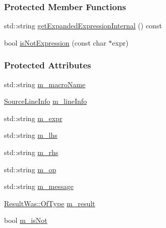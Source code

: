\subsubsection*{Protected Member Functions}
\begin{DoxyCompactItemize}
\item 
std\-::string \hyperlink{classCatch_1_1ResultInfo_a7a7f94f42a2b929b48cd1619028e1101}{get\-Expanded\-Expression\-Internal} () const 
\item 
bool \hyperlink{classCatch_1_1ResultInfo_a132ee623d29aadf0a8f031b766540629}{is\-Not\-Expression} (const char $\ast$expr)
\end{DoxyCompactItemize}
\subsubsection*{Protected Attributes}
\begin{DoxyCompactItemize}
\item 
std\-::string \hyperlink{classCatch_1_1ResultInfo_af7189e82393ce53451cebb99514117e9}{m\-\_\-macro\-Name}
\item 
\hyperlink{structCatch_1_1SourceLineInfo}{Source\-Line\-Info} \hyperlink{classCatch_1_1ResultInfo_a906b6d6fea26f8d34510ab7b60597a43}{m\-\_\-line\-Info}
\item 
std\-::string \hyperlink{classCatch_1_1ResultInfo_a61ae199b2f3eb23b734f8bf5383cf9a9}{m\-\_\-expr}
\item 
std\-::string \hyperlink{classCatch_1_1ResultInfo_af088cc41ffb8373060a77d5ab3b542a2}{m\-\_\-lhs}
\item 
std\-::string \hyperlink{classCatch_1_1ResultInfo_afa05ef8a897458eb861194097b7e577e}{m\-\_\-rhs}
\item 
std\-::string \hyperlink{classCatch_1_1ResultInfo_a477213435ccdb099aac1cede54b16619}{m\-\_\-op}
\item 
std\-::string \hyperlink{classCatch_1_1ResultInfo_ad80d9d47a9c9b6c69b8f6fb9f29e099f}{m\-\_\-message}
\item 
\hyperlink{structCatch_1_1ResultWas_a624e1ee3661fcf6094ceef1f654601ef}{Result\-Was\-::\-Of\-Type} \hyperlink{classCatch_1_1ResultInfo_a8512a95aad07750c2175b21f7555173c}{m\-\_\-result}
\item 
bool \hyperlink{classCatch_1_1ResultInfo_a06ff6701fda52a7de486cc1408cf6e82}{m\-\_\-is\-Not}
\end{DoxyCompactItemize}


